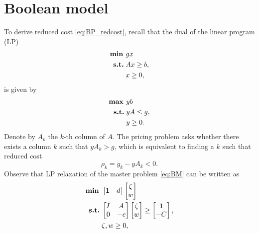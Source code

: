 \section{Boolean model}\label{sec:reduced_costs_boolean_model}
To derive reduced cost \eqref{eq:BP_redcost}, recall that the dual of the linear program (LP)
\begin{equation}\label{eq:LP_primal_general}
    \begin{split}
        \text{\textbf{min }} & gx \\
        \text{\textbf{s.t.}}\; & Ax \geq b, \\
        & x \geq 0,
    \end{split}
\end{equation}
is given by
\begin{equation}\label{eq:LP_primal_dual}
    \begin{split}
        \text{\textbf{max }} & yb \\
        \text{\textbf{s.t.}}\; & yA \leq g, \\
        & y \geq 0.
    \end{split}
\end{equation}
Denote by $A_k$ the $k$-th column of $A$.
The pricing problem asks whether there exists a column $k$ such that $yA_k > g$, which is equivalent to finding a $k$
such that reduced cost
\begin{equation}\label{eq:pricing_problem}
    \rho_k = g_k - yA_k < 0.
\end{equation}
Observe that LP relaxation of the master problem \eqref{eq:BM} can be written as
\begin{equation}\label{eq:BM_primal_vector}
    \begin{split}
        \text{\textbf{min }} & \begin{bmatrix}
                   \bm{1} & d
        \end{bmatrix} \begin{bmatrix}
                          \zeta \\ w
        \end{bmatrix} \\
        \text{\textbf{s.t.}}\; & \begin{bmatrix}
                  I & A \\ 0 & -c
        \end{bmatrix} \begin{bmatrix}
                          \zeta \\ w
        \end{bmatrix}
        \geq \begin{bmatrix}
                 \bm{1} \\ -C
        \end{bmatrix}, \\
        & \zeta, w \geq 0,
    \end{split}
\end{equation}
